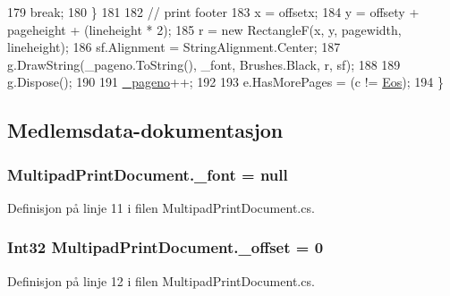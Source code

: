 \begin{DoxyCode}
179                 \textcolor{keywordflow}{break};
180         \}
181 
182         \textcolor{comment}{// print footer}
183         x = offsetx;
184         y = offsety + pageheight + (lineheight * 2);
185         r = \textcolor{keyword}{new} RectangleF(x, y, pagewidth, lineheight);
186         sf.Alignment = StringAlignment.Center;
187         g.DrawString(\_pageno.ToString(), \_font, Brushes.Black, r, sf);
188 
189         g.Dispose();
190 
191         \hyperlink{class_multipad_print_document_a1b6cabd162baf6ce1c5256059fa1e840}{\_pageno}++;
192 
193         e.HasMorePages = (c != \hyperlink{class_multipad_print_document_adfd2fe48dc1a582ea58044a93dda2353}{Eos});
194     \}
\end{DoxyCode}


\subsection{Medlemsdata-\/dokumentasjon}
\hypertarget{class_multipad_print_document_abfb15491f048283a8868a3b410f8b78e}{
\subsubsection[{\+\_\+font}]{ Multipad\+Print\+Document.\+\_\+font = null\hspace{0.3cm}{\ttfamily [private]}}}\label{class_multipad_print_document_abfb15491f048283a8868a3b410f8b78e}


Definisjon på linje 11 i filen Multipad\+Print\+Document.\+cs.

\hypertarget{class_multipad_print_document_a5a30e0a4319d60a90ea0ec1f861d4afa}{
\subsubsection[{\+\_\+offset}]{\setlength{\rightskip}{0pt plus 5cm}Int32 Multipad\+Print\+Document.\+\_\+offset = 0\hspace{0.3cm}{\ttfamily [private]}}}\label{class_multipad_print_document_a5a30e0a4319d60a90ea0ec1f861d4afa}


Definisjon på linje 12 i filen Multipad\+Print\+Document.\+cs.

